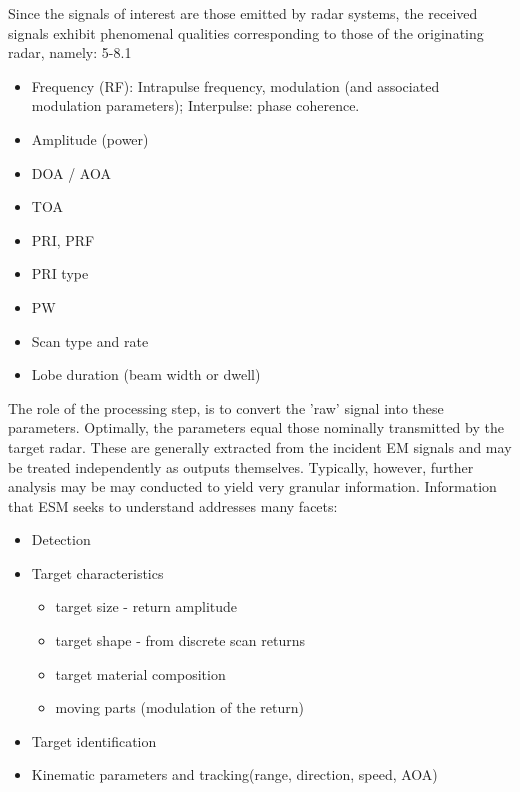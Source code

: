 Since the signals of interest are those emitted by radar systems, the received signals exhibit phenomenal qualities corresponding to those of the originating radar, namely: \cite{avionics_department_electronic_2013} 5-8.1
\begin{itemize}
    \item Frequency (\ac{RF}): Intrapulse frequency, modulation (and associated modulation parameters); Interpulse: phase coherence.
    \item Amplitude (power)
    \item \ac{DOA} / \ac{AOA}
    \item \ac{TOA}
    \item \ac{PRI}, \ac{PRF}
    \item \ac{PRI} type
    \item \ac{PW}
    \item Scan type and rate
    \item Lobe duration (beam width or dwell)
\end{itemize}

The role of the processing step, is to convert the 'raw' signal into these parameters. Optimally, the parameters equal those nominally transmitted by the target radar.
These are generally extracted from the incident \ac{EM} signals and may be treated independently as outputs themselves. Typically, however, further analysis may be may conducted to yield very granular information. Information that \ac{ESM} seeks to understand addresses many facets:
\begin{itemize}
    \item Detection
    \item Target characteristics \cite{jenn_radar_2007}
    \begin{itemize}
        \item target size - return amplitude
        \item target shape - from discrete scan returns
        \item target material composition
        \item moving parts (modulation of the return)
    \end{itemize}
    \item Target identification
    \item Kinematic parameters and tracking(range, direction, speed, \ac{AOA})
\end{itemize}


